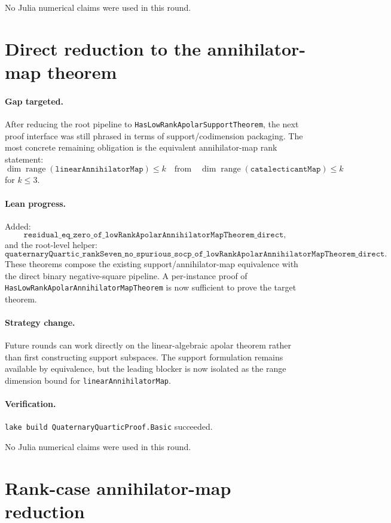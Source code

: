 \documentclass[11pt]{article}
\begin{document}
No Julia numerical claims were used in this round.

\section*{Direct reduction to the annihilator-map theorem}

\paragraph{Gap targeted.}
After reducing the root pipeline to
\texttt{HasLowRankApolarSupportTheorem}, the next proof interface was still
phrased in terms of support/codimension packaging.  The most concrete remaining
obligation is the equivalent annihilator-map rank statement:
\[
\dim \operatorname{range}(\texttt{linearAnnihilatorMap}) \le k
\quad\text{from}\quad
\dim \operatorname{range}(\texttt{catalecticantMap}) \le k
\]
for \(k \le 3\).

\paragraph{Lean progress.}
Added:
\[
\texttt{residual\_eq\_zero\_of\_lowRankApolarAnnihilatorMapTheorem\_direct},
\]
and the root-level helper:
\[
\texttt{quaternaryQuartic\_rankSeven\_no\_spurious\_socp\_of\_lowRankApolarAnnihilatorMapTheorem\_direct}.
\]
These theorems compose the existing support/annihilator-map equivalence with
the direct binary negative-square pipeline.  A per-instance proof of
\texttt{HasLowRankApolarAnnihilatorMapTheorem} is now sufficient to prove the
target theorem.

\paragraph{Strategy change.}
Future rounds can work directly on the linear-algebraic apolar theorem rather
than first constructing support subspaces.  The support formulation remains
available by equivalence, but the leading blocker is now isolated as the range
dimension bound for \texttt{linearAnnihilatorMap}.

\paragraph{Verification.}
\texttt{lake build QuaternaryQuarticProof.Basic} succeeded.

No Julia numerical claims were used in this round.

\section*{Rank-case annihilator-map reduction}
\end{document}
